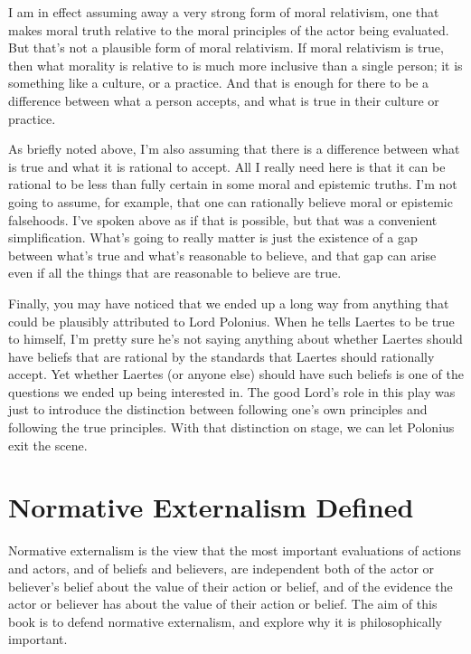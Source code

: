 \documentclass[
  10pt,
  letterpaper,
  twoside]{scrbook}
\begin{document}
I am in effect assuming away a very strong form of moral relativism, one
that makes moral truth relative to the moral principles of the actor
being evaluated. But that's not a plausible form of moral relativism. If
moral relativism is true, then what morality is relative to is much more
inclusive than a single person; it is something like a culture, or a
practice. And that is enough for there to be a difference between what a
person accepts, and what is true in their culture or practice.

As briefly noted above, I'm also assuming that there is a difference
between what is true and what it is rational to accept. All I really
need here is that it can be rational to be less than fully certain in
some moral and epistemic truths. I'm not going to assume, for example,
that one can rationally believe moral or epistemic falsehoods. I've
spoken above as if that is possible, but that was a convenient
simplification. What's going to really matter is just the existence of a
gap between what's true and what's reasonable to believe, and that gap
can arise even if all the things that are reasonable to believe are
true.

Finally, you may have noticed that we ended up a long way from anything
that could be plausibly attributed to Lord Polonius. When he tells
Laertes to be true to himself, I'm pretty sure he's not saying anything
about whether Laertes should have beliefs that are rational by the
standards that Laertes should rationally accept. Yet whether Laertes (or
anyone else) should have such beliefs is one of the questions we ended
up being interested in. The good Lord's role in this play was just to
introduce the distinction between following one's own principles and
following the true principles. With that distinction on stage, we can
let Polonius exit the scene.

\section{Normative Externalism
Defined}\label{normativeexternalismdefined}

Normative externalism is the view that the most important evaluations of
actions and actors, and of beliefs and believers, are independent both
of the actor or believer's belief about the value of their action or
belief, and of the evidence the actor or believer has about the value of
their action or belief. The aim of this book is to defend normative
externalism, and explore why it is philosophically important.
\end{document}
